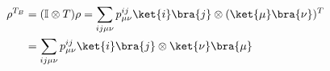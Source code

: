 \begin{equation}\label{eqn:rho_TB}
\begin{split}
      \rho^{T_B} &= (\mathbb{I}\otimes T){\rho} = \sum_{ij\mu\nu}p^{ij}_{\mu\nu}\ket{i}\bra{j} \otimes (\ket{\mu}\bra{\nu})^T \\
    &= \sum_{ij\mu\nu} p^{ij}_{\mu\nu} \ket{i}\bra{j} \otimes \ket{\nu}\bra{\mu}
\end{split}
\end{equation}
